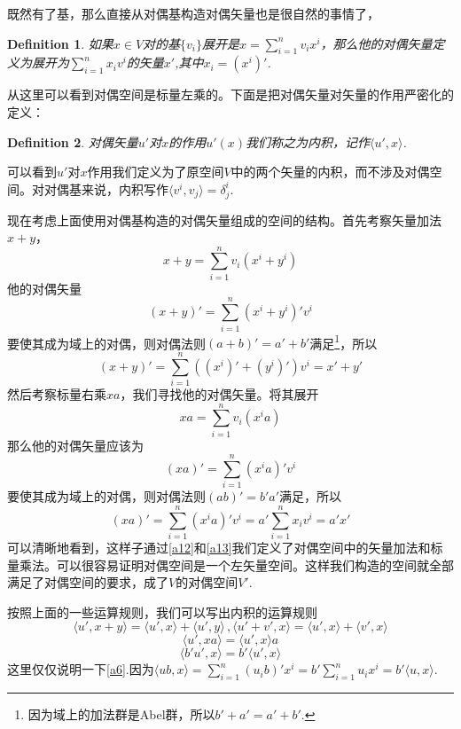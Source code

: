 \documentclass[11pt,a4paper,openany]{book}%
\theoremstyle{plain}%
\newtheorem{defi}{Definition}[chapter]%
\begin{document}
既然有了基，那么直接从对偶基构造对偶矢量也是很自然的事情了，
\begin{defi}
如果$x\in V$对的基$\{v_i\}$展开是$x=\sum_{i=1}^{n}v_{i}x^{i}$，那么他的对偶矢量定义为展开为$\sum_{i=1}^{n}x_{i}v^{i}$的矢量$x'$,其中$x_i=(x^i)'$.
\end{defi}

从这里可以看到对偶空间是标量左乘的。下面是把对偶矢量对矢量的作用严密化的定义：
\begin{defi}
\label{内积}
对偶矢量$u'$对$x$的作用$u'(x)$我们称之为内积，记作$\langle u',x \rangle$.
\end{defi}

\indent 可以看到$u'$对$x$作用我们定义为了原空间$V$中的两个矢量的内积，而不涉及对偶空间。对对偶基来说，内积写作$\langle v^i,v_j\rangle=\delta_{j}^i$.

现在考虑上面使用对偶基构造的对偶矢量组成的空间的结构。首先考察矢量加法$x+y$，
\[
x+y=\sum_{i=1}^{n}v_{i}(x^{i}+y^{i})
\]
他的对偶矢量
\[
(x+y)'=\sum_{i=1}^{n}(x^{i}+y^{i})'v^{i}
\]
要使其成为域上的对偶，则对偶法则$(a+b)'=a'+b'$满足\footnote{因为域上的加法群是Abel群，所以$b'+a'=a'+b'$.}，所以
\begin{equation}
\label{a12}
(x+y)'=\sum_{i=1}^{n}((x^{i})'+(y^{i})')v^{i}=x'+y'
\end{equation}
\indent 然后考察标量右乘$xa$，我们寻找他的对偶矢量。将其展开
\[
xa=\sum_{i=1}^{n}v_{i}(x^{i}a)
\]
那么他的对偶矢量应该为
\[
(xa)'=\sum_{i=1}^{n}(x^{i}a)'v^{i}
\]
要使其成为域上的对偶，则对偶法则$(ab)'=b'a'$满足，所以
\begin{equation}
\label{a13}
(xa)'=\sum_{i=1}^{n}(x^{i}a)'v^{i}=a'\sum_{i=1}^{n}x_{i}v^{i}=a'x'
\end{equation}
可以清晰地看到，这样子通过\eqref{a12}和\eqref{a13}我们定义了对偶空间中的矢量加法和标量乘法。可以很容易证明对偶空间是一个左矢量空间。这样我们构造的空间就全部满足了对偶空间的要求，成了$V$的对偶空间$V'$.

按照上面的一些运算规则，我们可以写出内积的运算规则
\[
\langle u',x+y \rangle=\langle u',x \rangle +\langle u',y \rangle \,,\langle u'+v',x \rangle=\langle u',x \rangle+\langle v',x \rangle
\]
\begin{equation}
\label{a5}
\langle u',xa \rangle=\langle u',x \rangle a
\end{equation}
\begin{equation}
\label{a6}
\langle b'u',x \rangle=b'\langle u',x \rangle
\end{equation}
这里仅仅说明一下\eqref{a6}.因为$\langle ub,x \rangle=\sum_{i=1}^n (u_ib)'x^i=b'\sum_{i=1}^n u_ix^i=b'\langle u,x \rangle$.
\end{document}
